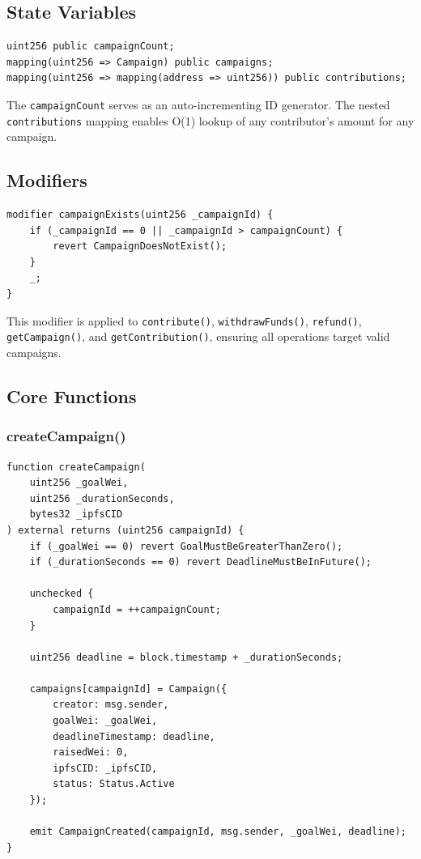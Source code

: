 \subsection{State Variables}

\begin{lstlisting}[language=Solidity, caption={State Variables}]
uint256 public campaignCount;
mapping(uint256 => Campaign) public campaigns;
mapping(uint256 => mapping(address => uint256)) public contributions;
\end{lstlisting}

The \texttt{campaignCount} serves as an auto-incrementing ID generator. The nested \texttt{contributions} mapping enables O(1) lookup of any contributor's amount for any campaign.

\subsection{Modifiers}

\begin{lstlisting}[language=Solidity, caption={Campaign Existence Modifier}]
modifier campaignExists(uint256 _campaignId) {
    if (_campaignId == 0 || _campaignId > campaignCount) {
        revert CampaignDoesNotExist();
    }
    _;
}
\end{lstlisting}

This modifier is applied to \texttt{contribute()}, \texttt{withdrawFunds()}, \texttt{refund()}, \texttt{getCampaign()}, and \texttt{getContribution()}, ensuring all operations target valid campaigns.

\subsection{Core Functions}

\subsubsection{createCampaign()}

\begin{lstlisting}[language=Solidity, caption={Campaign Creation}]
function createCampaign(
    uint256 _goalWei,
    uint256 _durationSeconds,
    bytes32 _ipfsCID
) external returns (uint256 campaignId) {
    if (_goalWei == 0) revert GoalMustBeGreaterThanZero();
    if (_durationSeconds == 0) revert DeadlineMustBeInFuture();

    unchecked {
        campaignId = ++campaignCount;
    }

    uint256 deadline = block.timestamp + _durationSeconds;

    campaigns[campaignId] = Campaign({
        creator: msg.sender,
        goalWei: _goalWei,
        deadlineTimestamp: deadline,
        raisedWei: 0,
        ipfsCID: _ipfsCID,
        status: Status.Active
    });

    emit CampaignCreated(campaignId, msg.sender, _goalWei, deadline);
}
\end{lstlisting}

